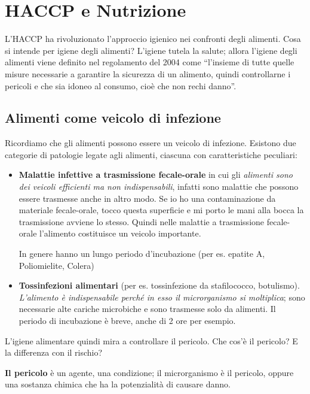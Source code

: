 \section{HACCP e Nutrizione}

L'HACCP ha rivoluzionato l'approccio igienico nei confronti degli
alimenti. Cosa si intende per igiene degli alimenti? L'igiene tutela la
salute; allora l'igiene degli alimenti viene definito nel regolamento
del 2004 come ``l'insieme di tutte quelle misure necessarie a garantire
la sicurezza di un alimento, quindi controllarne i pericoli e che sia
idoneo al consumo, cioè che non rechi danno''.

\subsection{Alimenti come veicolo di infezione}

Ricordiamo che gli alimenti possono essere un veicolo di infezione.
Esistono due categorie di patologie legate agli alimenti, ciascuna con
caratteristiche peculiari:

\begin{itemize}
\item
  \textbf{Malattie infettive a trasmissione fecale-orale} in cui gli
  \emph{alimenti sono dei veicoli efficienti ma non indispensabili},
  infatti sono malattie che possono essere trasmesse anche in altro
  modo. Se io ho una contaminazione da materiale fecale-orale, tocco
  questa superficie e mi porto le mani alla bocca la trasmissione
  avviene lo stesso. Quindi nelle malattie a trasmissione fecale-orale
  l'alimento costituisce un veicolo importante.

In genere hanno un lungo periodo d'incubazione (per es. epatite A,
Poliomielite, Colera)

\item
  \textbf{Tossinfezioni alimentari} (per es. tossinfezione da
  stafilococco, botulismo). \emph{L'alimento è indispensabile perché in
  esso il microrganismo si moltiplica}; sono necessarie alte cariche
  microbiche e sono trasmesse solo da alimenti. Il periodo di
  incubazione è breve, anche di 2 ore per esempio.
\end{itemize}

L'igiene alimentare quindi mira a controllare il pericolo. Che cos'è il
pericolo? E la differenza con il rischio?

\textbf{Il pericolo} è un agente, una condizione; il microrganismo è il
pericolo, oppure una sostanza chimica che ha la potenzialità di causare
danno.

